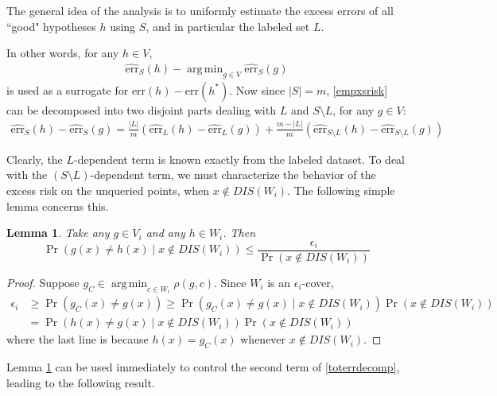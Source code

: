 \documentclass{article}[12pt]
\newtheorem{lem}[thm]{Lemma}
\theoremstyle{named}
\DeclareMathOperator*{\argmin}{arg\,min}
\DeclareMathOperator{\Prtxt}{Pr}
\newcommand{\abs}[1]{\left| #1 \right|}
\newcommand{\prp}[2]{\Prtxt_{#2} \left(#1\right)}
\newcommand{\err}[1]{\mbox{err}\left(#1\right)}
\newcommand{\emperr}[2]{\widehat{\mbox{err}}_{#2} \left(#1\right)}
\newcommand{\lrp}[1]{\left(#1\right)}
\begin{document}
The general idea of the analysis is to uniformly estimate the excess errors of all ``good" hypotheses $h$ using $S$, 
and in particular the labeled set $L$. 

In other words, for any $h \in V$,
\begin{align}
\label{empxsrisk}
\emperr{h}{S} - \argmin_{g \in V} \emperr{g}{S}
\end{align} 
is used as a surrogate for $\err{h} - \err{h^*}$. 
Now since $\abs{S} = m$, 
\eqref{empxsrisk} can be decomposed into two disjoint parts dealing with $L$ and $S \setminus L$, 
for any $g \in V$: 
\begin{align}
\label{toterrdecomp}
\emperr{h}{S} - \emperr{g}{S} = \frac{\abs{L}}{m} \lrp{\emperr{h}{L}  - \emperr{g}{L} } + 
\frac{m - \abs{L}}{m} \lrp{ \emperr{h}{S \setminus L} - \emperr{g}{S \setminus L} }
\end{align}

Clearly, 
the $L$-dependent term is known exactly from the labeled dataset. 
To deal with the $(S \setminus L)$-dependent term, 
we must characterize the behavior of the excess risk on the unqueried points, when $x \notin DIS(W_i)$. 
The following simple lemma concerns this.

\begin{lem}
\label{lem:unquerieddisregion}
Take any $g \in V_i$ and any $h \in W_i$. 
Then 
$$\prp{g(x) \neq h(x) \mid x \notin DIS(W_i)}{} \leq \frac{\epsilon_i}{\prp{x \notin DIS(W_i)}{}} $$
\end{lem}
\begin{proof}
Suppose $ g_C \in \argmin_{c \in W_i} \rho(g, c)$. 
Since $W_i$ is an $\epsilon_i$-cover, 
\begin{align*}
\epsilon_i &\geq \prp{g_C (x) \neq g (x)}{} \geq \prp{g_C (x) \neq g (x) \mid x \notin DIS(W_i)}{} \prp{x \notin DIS(W_i)}{} \\
&= \prp{h (x) \neq g (x) \mid x \notin DIS(W_i)}{} \prp{x \notin DIS(W_i)}{}
\end{align*}
where the last line is because $h(x) = g_C(x)$ whenever $x \notin DIS(W_i)$.
\end{proof}

Lemma \ref{lem:unquerieddisregion} can be used immediately 
to control the second term of \eqref{toterrdecomp}, 
leading to the following result. 
\end{document}
